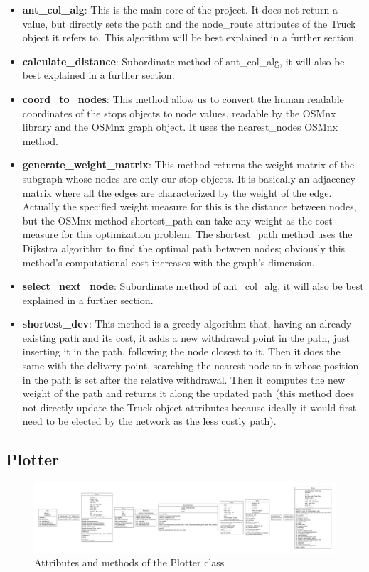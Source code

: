 \documentclass[titlepage]{article}
\begin{document}
\begin{itemize}
    \item \textbf{ant\_col\_alg}: This is the main core of the project. It does not return a value, but directly sets the path and the node\_route attributes of the Truck object it refers to. This algorithm will be best explained in a further section.
    \item \textbf{calculate\_distance}: Subordinate method of ant\_col\_alg, it will also be best explained in a further section.
    \item \textbf{coord\_to\_nodes}: This method allow us to convert the human readable coordinates of the stops objects to node values, readable by the OSMnx library and the OSMnx graph object. It uses the nearest\_nodes OSMnx method.
    \item \textbf{generate\_weight\_matrix}: This method returns the weight matrix of the subgraph whose nodes are only our stop objects. It is basically an adjacency matrix where all the edges are characterized by the weight of the edge. Actually the specified weight measure for this is the distance between nodes, but the OSMnx method shortest\_path can take any weight as the cost measure for this optimization problem. The shortest\_path method uses the Dijkstra algorithm to find the optimal path between nodes; obviously this method's computational cost increases with the graph's dimension.
    \item \textbf{select\_next\_node}: Subordinate method of ant\_col\_alg, it will also be best explained in a further section.
    \item \textbf{shortest\_dev}: This method is a greedy algorithm that, having an already existing path and its cost, it adds a new withdrawal point in the path, just inserting it in the path, following the node closest to it. Then it does the same with the delivery point, searching the nearest node to it whose position in the path is set after the relative withdrawal. Then it computes the new weight of the path and returns it along the updated path (this method does not directly update the Truck object attributes because ideally it would first need to be elected by the network as the less costly path).
\end{itemize}

\subsection{Plotter}
\begin{figure}[H]
    \centering
    \includegraphics[trim={26cm 8cm 66cm 8cm}, clip, scale=.5]{img/classes.pdf}
    \caption{Attributes and methods of the Plotter class}
    \label{fig:plotter_class}
\end{figure}
\end{document}
